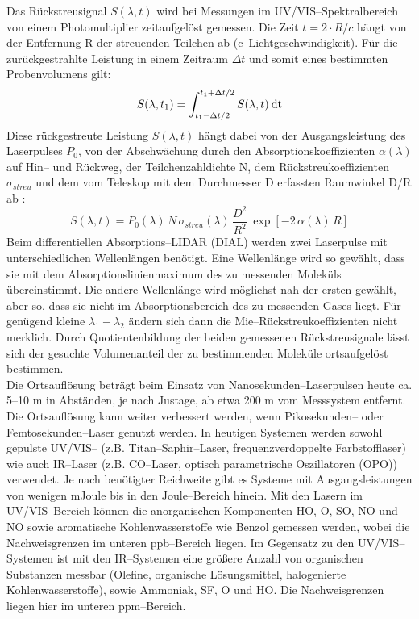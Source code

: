 Das Rückstreusignal $S(\lambda,t)$ wird bei Messungen im
UV/VIS--Spektralbereich von einem Photomultiplier zeitaufgelöst
gemessen. Die Zeit $t=2 \cdot R/c$ hängt von der Entfernung R der
streuenden Teilchen ab (c--Lichtgeschwindigkeit). Für die
zurückgestrahlte Leistung in einem Zeitraum $\Delta t$ und somit
eines bestimmten Probenvolumens gilt:
\begin{equation}\label{eqlidar1}
  S(\lambda , t_1)=\int^{t_1+\Delta t/2}_{t_1-\Delta t/2}
  S(\lambda , t) \: {\rm dt}
\end{equation}
Diese rückgestreute Leistung $S(\lambda,t)$ hängt dabei von der
Ausgangsleistung des Laserpulses $P_0$, von der Abschwächung durch
den Absorptionskoeffizienten $\alpha(\lambda)$ auf Hin-- und
Rückweg, der Teilchenzahldichte N, dem Rückstreukoeffizienten
$\sigma_{streu}$ und dem vom Teleskop mit dem Durchmesser D
erfassten Raumwinkel D/R ab \cite{measures84}:
\begin{equation}\label{eqlidar2}
  S(\lambda,t)=P_0(\lambda)\, N\, \sigma_{streu}(\lambda)\,
  \frac{D^2}{R^2}\: \exp[-2\,\alpha(\lambda)\, R]
\end{equation}
Beim differentiellen Absorptions--LIDAR (DIAL) werden zwei
Laserpulse mit unterschiedlichen Wellenlängen benötigt. Eine
Wellenlänge wird so gewählt, dass sie mit dem
Absorptionslinienmaximum des zu messenden Moleküls übereinstimmt.
Die andere Wellenlänge wird möglichst nah der ersten gewählt, aber
so, dass sie nicht im Absorptionsbereich des zu messenden Gases
liegt. Für genügend kleine $\lambda_1-\lambda_2$ ändern sich dann
die Mie--Rückstreukoeffizienten nicht merklich. Durch
Quotientenbildung der beiden gemessenen Rückstreusignale lässt
sich der gesuchte Volumenanteil der zu bestimmenden Moleküle
ortsaufgelöst bestimmen.\\

Die Ortsauflösung beträgt beim Einsatz von
Nanosekunden--Laserpulsen heute ca. 5--10 m in Abständen, je nach
Justage, ab etwa 200 m vom Messsystem entfernt. Die Ortsauflösung
kann weiter verbessert werden, wenn Pikosekunden-- oder
Femtosekunden--Laser genutzt werden. In heutigen Systemen werden
sowohl gepulste UV/VIS-- (z.B. Titan--Saphir--Laser,
frequenzverdoppelte Farbstofflaser) wie auch IR--Laser (z.B.
CO--Laser, optisch parametrische Oszillatoren (OPO))
verwendet. Je nach benötigter Reichweite gibt es Systeme mit
Ausgangsleistungen von wenigen mJoule bis in den Joule--Bereich
hinein. Mit den Lasern im UV/VIS--Bereich können die anorganischen
Komponenten HO, O, SO, NO und NO
sowie aromatische Kohlenwasserstoffe wie Benzol gemessen werden,
wobei die Nachweisgrenzen im unteren ppb--Bereich liegen. Im
Gegensatz zu den UV/VIS--Systemen ist mit den IR--Systemen eine
grö{\ss}ere Anzahl von organischen Substanzen messbar (Olefine,
organische Lösungsmittel, halogenierte Kohlenwasserstoffe), sowie
Ammoniak, SF, O und HO. Die
Nachweisgrenzen liegen hier im unteren ppm--Bereich.\\

